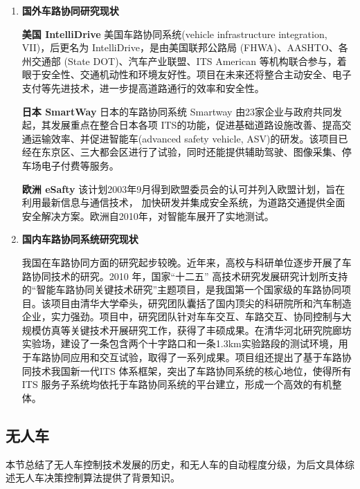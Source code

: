 \begin{enumerate}[wide=\parindent]
\item \textbf{国外车路协同研究现状}

\textbf{美国  IntelliDrive} 美国车路协同系统(vehicle infrastructure integration, VII)，后更名为 IntelliDrive，是由美国联邦公路局 (FHWA)、AASHTO、各州交通部 (State DOT)、汽车产业联盟、ITS American 等机构联合参与，着眼于安全性、交通机动性和环境友好性。项目在未来还将整合主动安全、电子支付等先进技术，进一步提高道路通行的效率和安全性。

\textbf{日本  SmartWay} 日本的车路协同系统 Smartway \cite{Hiroshi2005Smartway} 由23家企业与政府共同发起，其发展重点在整合日本各项 ITS的功能，促进基础道路设施改善、提高交通运输效率、并促进智能车(advanced safety vehicle, ASV)\cite{Chapman2010USING}的研发。该项目已经在东京区、三大都会区进行了试验，同时还能提供辅助驾驶、图像采集、停车场电子付费等服务。

\textbf{欧洲  eSafty} 该计划2003年9月得到欧盟委员会的认可并列入欧盟计划，旨在利用最新信息与通信技术，
加快研发并集成安全系统，为道路交通提供全面安全解决方案。欧洲自2010年，对智能车展开了实地测试。

\item \textbf{国内车路协同系统研究现状}

我国在车路协同方面的研究起步较晚。近年来，高校与科研单位逐步开展了车路协同技术的研究\cite{Tian2010A,Danno2009VEHICLE}。2010 年，国家“十二五” 高技术研究发展研究计划所支持的“智能车路协同关键技术研究”主题项目，是我国第一个国家级的车路协同项目。该项目由清华大学牵头，研究团队囊括了国内顶尖的科研院所和汽车制造企业，实力强劲。项目中，研究团队针对车车交互、车路交互、协同控制与大规模仿真等关键技术开展研究工作，获得了丰硕成果。在清华河北研究院廊坊实验场，建设了一条包含两个十字路口和一条1.3km实验路段的测试环境，用于车路协同应用和交互试验，取得了一系列成果。项目组还提出了基于车路协同技术我国新一代ITS 体系框架，突出了车路协同系统的核心地位，使得所有ITS 服务子系统均依托于车路协同系统的平台建立，形成一个高效的有机整体。
\end{enumerate}

\subsection{无人车}
\label{sec:self}

本节总结了无人车控制技术发展的历史，和无人车的自动程度分级，为后文具体综述无人车决策控制算法提供了背景知识。

